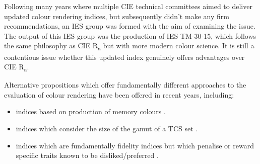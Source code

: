 Following many years where multiple \gls{CIE} technical committees aimed to deliver updated colour rendering indices, but subsequently didn't make any firm recommendations, an IES group was formed with the aim of examining the issue. The output of this IES group was the production of IES TM-30-15\cite{ies_ies_2015}, which follows the same philosophy as \gls{CIE} R\textsubscript{a} but with more modern colour science. It is still a contentious issue whether this updated index genuinely offers advantages over \gls{CIE} R\textsubscript{a}. 

Alternative propositions which offer fundamentally different approaches to the evaluation of colour rendering have been offered in recent years, including: 
\begin{itemize}
\item indices based on production of memory colours \citep{smet_memory_2012}.
\item indices which consider the size of the gamut of a TCS set \citep{rea_color_2008,teunissen_characterising_2016}.
\item indices which are fundamentally fidelity indices but which penalise or reward specific traits known to be disliked/preferred \citep{ohno_rationale_2010}.
\end{itemize}


